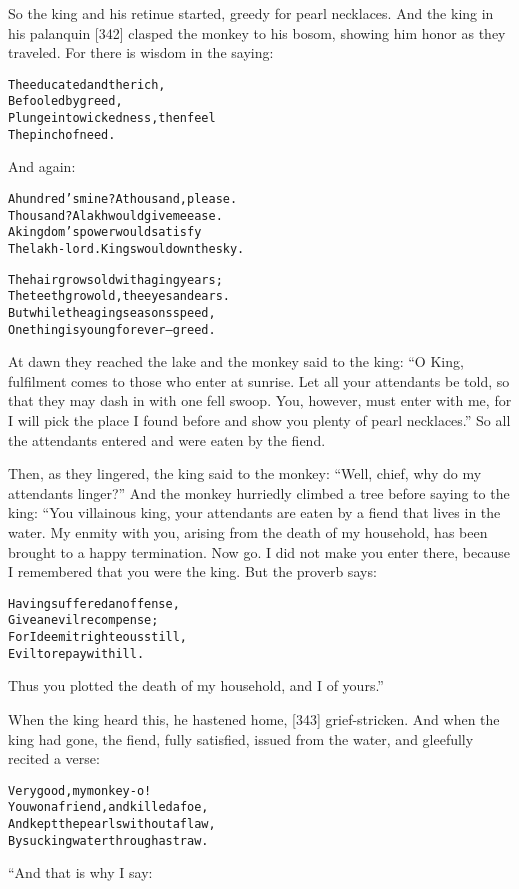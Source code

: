 \documentclass{article}
\renewenvironment{verbatim}{\begin{alltt}\normalfont\begin{centering}}{\end{centering}\end{alltt}}
\begin{document}
So the king and his retinue started, greedy for pearl necklaces.
And the king in his palanquin [342] clasped the monkey to his
bosom, showing him honor as they traveled. For there is wisdom in
the saying:

\begin{verbatim}
The educated and the rich,
    Befooled by greed,
Plunge into wickedness, then feel
    The pinch of need.
\end{verbatim}
And again:

\begin{verbatim}
A hundred's mine? A thousand, please.
Thousand? A lakh would give me ease.
A kingdom's power would satisfy
The lakh-lord. Kings would own the sky.

The hair grows old with aging years;
The teeth grow old, the eyes and ears.
But while the aging seasons speed,
One thing is young forever--greed.
\end{verbatim}
At dawn they reached the lake and the monkey said to the king:
``O King, fulfilment comes to those who enter at sunrise. Let all your attendants be told, so that they may dash in with one fell swoop. You, however, must enter with me, for I will pick the place I found before and show you plenty of pearl necklaces.''
So all the attendants entered and were eaten by the fiend.

Then, as they lingered, the king said to the monkey:
``Well, chief, why do my attendants linger?'' And the monkey
hurriedly climbed a tree before saying to the king: “You villainous
king, your attendants are eaten by a fiend that lives in the water.
My enmity with you, arising from the death of my household, has
been brought to a happy termination. Now go. I did not make you
enter there, because I remembered that you were the king. But the
proverb says:

\begin{verbatim}
Having suffered an offense,
Give an evil recompense;
For I deem it righteous still,
Evil to repay with ill.
\end{verbatim}
Thus you plotted the death of my household, and I of yours.”

When the king heard this, he hastened home, [343] grief-stricken.
And when the king had gone, the fiend, fully satisfied, issued from
the water, and gleefully recited a verse:

\begin{verbatim}
Very good, my monkey-o!
You won a friend, and killed a foe,
And kept the pearls without a flaw,
By sucking water through a straw.                       
\end{verbatim}
“And that is why I say:
\end{document}
